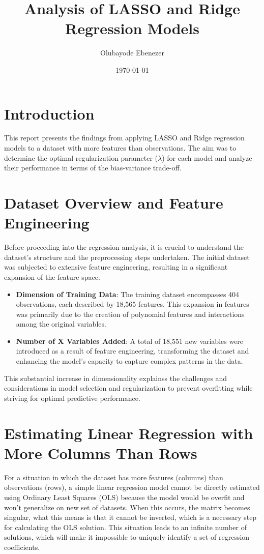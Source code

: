 \documentclass[12pt]{article}
\title{Analysis of LASSO and Ridge Regression Models}
\author{Olubayode Ebenezer}
\date{\today}
\begin{document}
\maketitle

\section{Introduction}

This report presents the findings from applying LASSO and Ridge regression models to a dataset with more features than observations. The aim was to determine the optimal regularization parameter (\(\lambda\)) for each model and analyze their performance in terms of the bias-variance trade-off.


\section{Dataset Overview and Feature Engineering}

Before proceeding into the regression analysis, it is crucial to understand the dataset's structure and the preprocessing steps undertaken. The initial dataset was subjected to extensive feature engineering, resulting in a significant expansion of the feature space.

\begin{itemize}
    \item \textbf{Dimension of Training Data}: The training dataset encompasses 404 observations, each described by 18,565 features. This expansion in features was primarily due to the creation of polynomial features and interactions among the original variables.
    \item \textbf{Number of X Variables Added}: A total of 18,551 new variables were introduced as a result of feature engineering, transforming the dataset and enhancing the model's capacity to capture complex patterns in the data.
\end{itemize}

This substantial increase in dimensionality explainss the challenges and considerations in model selection and regularization to prevent overfitting while striving for optimal predictive performance.


\section{Estimating Linear Regression with More Columns Than Rows}

For a situation in which the dataset has more features (columns) than observations (rows), a simple linear regression model cannot be directly estimated using Ordinary Least Squares (OLS) because the model would be overfit and won't generalize on new set of datasets. When this occurs, the matrix becomes singular, what this means is that it cannot be inverted, which is a necessary step for calculating the OLS solution. This situation leads to an infinite number of solutions, which will make it impossible to uniquely identify a set of regression coefficients.
\end{document}
